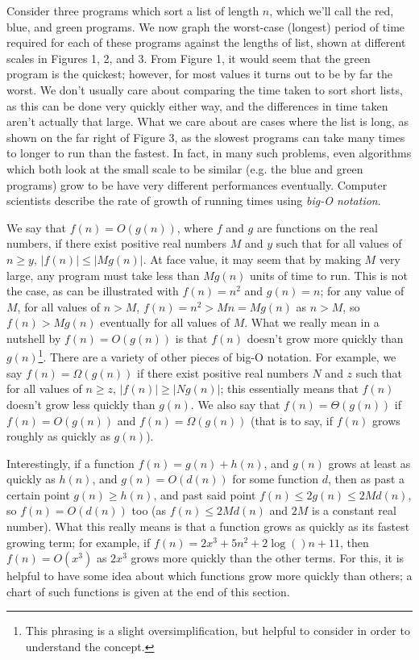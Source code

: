\documentclass[10pt,a4paper]{article}
\begin{document}
\begin{multicols}{2}
	
	Consider three programs which sort a list of length \(n\), which we'll call the red, blue, and green programs. We now graph the worst-case (longest) period of time required for each of these programs against the lengths of list, shown at different scales in Figures 1, 2, and 3. From Figure 1, it would seem that the green program is the quickest; however, for most values it turns out to be by far the worst. We don't usually care about comparing the time taken to sort short lists, as this can be done very quickly either way, and the differences in time taken aren't actually that large. What we care about are cases where the list is long, as shown on the far right of Figure 3, as the slowest programs can take many times to longer to run than the fastest. In fact, in many such problems, even algorithms which both look at the small scale to be similar (e.g. the blue and green programs) grow to be have very different performances eventually. Computer scientists describe the rate of growth of running times using \textit{big-O notation}.
	
	We say that \(f(n)=O(g(n))\), where \(f\) and \(g\) are functions on the real numbers, if there exist positive real numbers \(M\) and \(y\) such that for all values of \(n \geq{} y\), \(|f(n)|\leq{}|Mg(n)|\). At face value, it may seem that by making \(M\) very large, any program must take less than \(Mg(n)\) units of time to run. This is not the case, as can be illustrated with \(f(n)=n^2\) and \(g(n)=n\); for any value of \(M\), for all values of \(n>M\), \(f(n)=n^2>Mn=Mg(n)\) as \(n>M\), so \(f(n)>Mg(n)\) eventually for all values of \(M\). What we really mean in a nutshell by \(f(n)=O(g(n))\) is that \(f(n)\) doesn't grow more quickly than \(g(n)\)\footnote{This phrasing is a slight oversimplification, but helpful to consider in order to understand the concept.}. There are a variety of other pieces of big-O notation. For example, we say \(f(n)=\Omega(g(n))\) if there exist positive real numbers \(N\) and \(z\) such that for all values of \(n \geq{} z\), \(|f(n)|\geq{}|Ng(n)|\); this essentially means that \(f(n)\) doesn't grow less quickly than \(g(n)\)\footnotemark[\value{footnote}]. We also say that \(f(n)=\Theta(g(n))\) if \(f(n)=O(g(n))\) and \(f(n)=\Omega(g(n))\) (that is to say, if \(f(n)\) grows roughly as quickly as \(g(n)\)\footnotemark[\value{footnote}]).
	
	Interestingly, if a function \(f(n)=g(n)+h(n)\), and \(g(n)\) grows at least as quickly as \(h(n)\), and \(g(n)=O(d(n))\) for some function \(d\), then as past a certain point \(g(n)\geq{}h(n)\), and past said point \(f(n)\leq{}2g(n)\leq2Md(n)\), so \(f(n)=O(d(n))\) too (as \(f(n)\leq{}2Md(n)\) and \(2M\) is a constant real number). What this really means is that a function grows as quickly as its fastest growing term; for example, if \(f(n)=2x^3 + 5n^2 + 2\log()n + 11\), then \(f(n)=O(x^3)\) as \(2x^3\) grows more quickly than the other terms. For this, it is helpful to have some idea about which functions grow more quickly than others; a chart of such functions is given at the end of this section.
	

\end{multicols}
\end{document}
